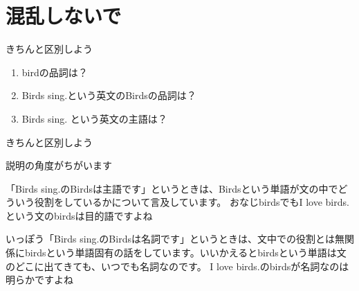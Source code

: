 \documentclass[aspectratio=169,xcolor={dvipsnames,table}]{beamer}
\begin{document}
\section{混乱しないで}
\begin{frame}[plain]{きちんと区別しよう}
 \begin{enumerate}
  \item<1-> birdの品詞は？\hfill\visible<2->{名詞}
  \item<3-> Birds sing.という英文のBirdsの品詞は？\hfill{}
  \item<5-> Birds sing. という英文の主語は？\hfill{}
 \end{enumerate}


\end{frame}
\begin{frame}[plain]{きちんと区別しよう}

説明の角度がちがいます\pause

\bigskip

「Birds sing.のBirdsは主語です」というときは、Birdsという単語が文の中でどういう役割をしているかについて言及しています。\pause
おなじbirdsでもI love birds.という文のbirdsは目的語ですよね\pause

\bigskip

いっぽう「Birds sing.のBirdsは名詞です」というときは、文中での役割とは無関係にbirdsという単語固有の話をしています。いいかえるとbirdsという単語は文のどこに出てきても、いつでも名詞なのです。
I love birds.のbirdsが名詞なのは明らかですよね
\end{frame}
\end{document}
